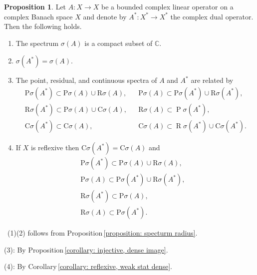 \documentclass[12pt,a4paper]{book}
\newenvironment{prooff}{{\noindent\it\textcolor{cyan!40!black}{Proof}:}\,}{\par}
\newenvironment{enu}{\begin{enumerate}[(1)]}{\end{enumerate}}
\theoremstyle{definition}
\newtheorem{prop}[defn]{Proposition}
\begin{document}
\begin{prop}
    Let $A: X \rightarrow X$ be a bounded complex linear operator on a complex Banach space $X$ and denote by $A^*: X^* \rightarrow X^*$ the complex dual operator. Then the following holds.
\begin{enu} 
    \item The spectrum $\sigma(A)$ is a compact subset of $\mathbb{C}$.
    \item $\sigma\left(A^*\right)=\sigma(A)$.
    \item The point, residual, and continuous spectra of $A$ and $A^*$ are related by
    $$
    \begin{array}{lll}
    \mathrm{P} \sigma\left(A^*\right) \subset \mathrm{P} \sigma(A) \cup \mathrm{R} \sigma(A), & & \mathrm{P} \sigma(A) \subset \mathrm{P} \sigma\left(A^*\right) \cup \mathrm{R} \sigma\left(A^*\right), \\
    \mathrm{R} \sigma\left(A^*\right) \subset \mathrm{P} \sigma(A) \cup \mathrm{C} \sigma(A), & & \mathrm{R} \sigma(A) \subset \operatorname{P} \sigma\left(A^*\right), \\
    \mathrm{C} \sigma\left(A^*\right) \subset \mathrm{C} \sigma(A), & & \mathrm{C} \sigma(A) \subset \operatorname{R} \sigma\left(A^*\right) \cup \mathrm{C} \sigma\left(A^*\right) .
    \end{array}
    $$  
    \item If $X$ is reflexive then $\mathrm{C} \sigma\left(A^*\right)=\mathrm{C} \sigma(A)$ and    
    $$
    \begin{array}{ll}
    \mathrm{P} \sigma\left(A^*\right) \subset \mathrm{P} \sigma(A) \cup \mathrm{R} \sigma(A), & \\
    \mathrm{P} \sigma(A) \subset \mathrm{P} \sigma\left(A^*\right) \cup \mathrm{R} \sigma\left(A^*\right), \\
    \mathrm{R} \sigma\left(A^*\right) \subset \mathrm{P} \sigma(A), \\ 
    \mathrm{R} \sigma(A) \subset \mathrm{P} \sigma\left(A^*\right) .
    \end{array}
    $$
\end{enu}
\end{prop}
\begin{prooff}
    (1)(2) follows from Proposition\,\ref{proposition: specturm radius}. 

    (3): By Proposition\,\ref{corollary: injective, dense image}.

    (4): By Corollary\,\ref{corollary: reflexive, weak stat dense}. 
\end{prooff}
\end{document}
